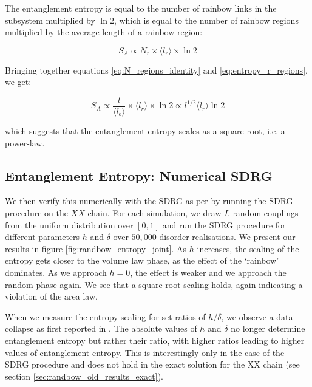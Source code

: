 The entanglement entropy is equal to the number of rainbow links in the subsystem multiplied by $\ln 2$, which is equal to the number of rainbow regions multiplied by the average length of a rainbow region: 

\begin{equation}\label{eq:entropy_r_regions}
	S_A \propto N_r \times \langle l_r \rangle \times \ln 2
\end{equation}

Bringing together equations \ref{eq:N_regions_identity} and \ref{eq:entropy_r_regions}, we get:

\begin{equation}
	S_A \propto \frac{l}{\langle l_b \rangle} \times \langle l_r \rangle \times \ln 2 \propto l^{1/2} \langle l_r \rangle \ln2
\end{equation}

which suggests that the entanglement entropy scales as a square root, i.e. a power-law.

\subsection{Entanglement Entropy: Numerical SDRG}

We then verify this numerically with the SDRG as per \cite{paola2018} by running the SDRG procedure on the $XX$ chain. For each simulation, we draw $L$ random couplings from the uniform distribution over $[0, 1]$ and run the SDRG procedure for different parameters $h$ and $\delta$ over $50, 000$ disorder realisations. We present our results in figure \ref{fig:randbow_entropy_joint}. As $h$ increases, the scaling of the entropy gets closer to the volume law phase, as the effect of the `rainbow' dominates. As we approach $h = 0$, the effect is weaker and we approach the random phase again. We see that a square root scaling holds, again indicating a violation of the area law. 

When we measure the entropy scaling for set ratios of $h/\delta$, we observe a data collapse as first reported in \cite{paola2018}. The absolute values of $h$ and $\delta$ no longer determine entanglement entropy but rather their ratio, with higher ratios leading to higher values of entanglement entropy. This is interestingly only in the case of the SDRG procedure and does not hold in the exact solution for the XX chain (see section \ref{sec:randbow_old_results_exact}). 

